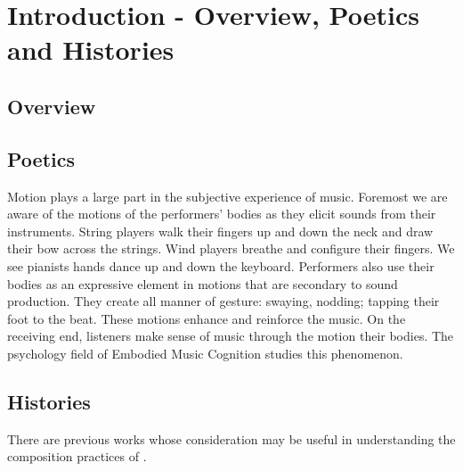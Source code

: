 \chapter{Introduction - Overview, Poetics and Histories}
\section{Overview}

\section{Poetics}
Motion plays a large part in the subjective experience of music. Foremost we are aware of the motions of the performers' bodies as they elicit sounds from their instruments. String players walk their fingers up and down the neck and draw their bow across the strings. Wind players breathe and configure their fingers. We see pianists hands dance up and down the keyboard. Performers also use their bodies as an expressive element in motions that are secondary to sound production. They create all manner of gesture: swaying, nodding; tapping their foot to the beat. These motions enhance and reinforce the music. On the receiving end, listeners make sense of music through the motion their bodies. The psychology field of Embodied Music Cognition studies this phenomenon.  

\section{Histories}
There are previous works whose consideration may be useful in understanding the composition practices of \compositionTitle.


